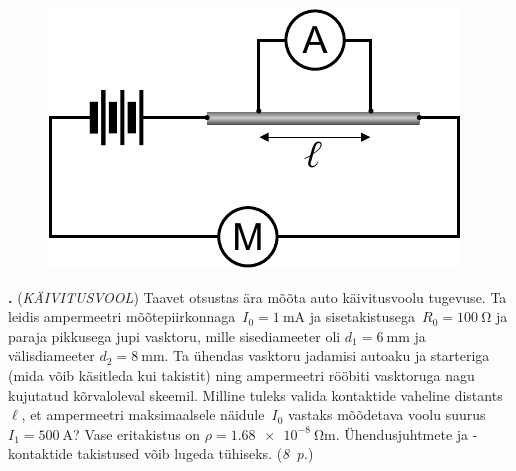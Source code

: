 \documentclass[11pt,a5paper]{article}
\newcommand{\numb}[1]{\vspace{5pt}\textbf{\large #1}}
\newcommand{\nimi}[1]{(\textsl{\small #1})}
\newcommand{\punktid}[1]{(\emph{#1~p.})}
\newcounter{ylesanne}
\newcommand{\yl}[1]{\addtocounter{ylesanne}{1}\numb{\theylesanne.} \nimi{#1} \newblock{}}
\begin{document}
\begin{figure}
  \vspace{-25pt}
  \begin{center}
  \includegraphics[scale=0.6]{kaivitusvool_joonis.pdf}
  \vspace{-20pt}
  \end{center}
\end{figure}
\yl{KÄIVITUSVOOL}
Taavet otsustas ära mõõta auto käivitusvoolu tugevuse. Ta leidis ampermeetri
mõõtepiirkonnaga~$I_0=\SI{1}{\milli\ampere}$ ja sisetakistusega~$R_0=\SI{100}{\ohm}$
ja paraja pikkusega jupi vasktoru, mille sisediameeter oli
$d_1=\SI{6}{\milli\meter}$ ja välisdiameeter $d_2=\SI{8}{\milli\meter}$. Ta ühendas
vasktoru jadamisi autoaku ja starteriga (mida võib käsitleda kui takistit) ning ampermeetri rööbiti
vasktoruga nagu kujutatud kõrvaloleval skeemil. Milline tuleks
valida kontaktide vaheline distants~$\ell$, et ampermeetri maksimaalsele
näidule~$I_0$ vastaks mõõdetava voolu suurus $I_1=\SI{500}{\ampere}$?
Vase eritakistus on $\rho=\SI{1.68e-8}{\ohm\meter}$. Ühendusjuhtmete ja
-kontaktide takistused võib lugeda tühiseks.
\punktid{8}
\end{document}
